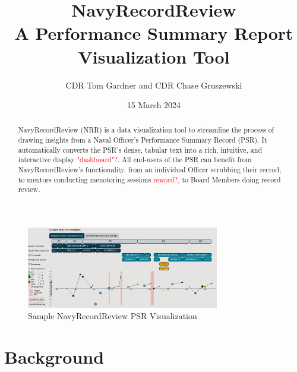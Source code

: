 \documentclass[UTF8]{article}
\begin{document}
\title{
  NavyRecordReview \\
  \large A Performance Summary Report Visualization Tool
}

\author{CDR Tom Gardner and CDR Chase Gruszewski}
\date{15 March 2024}
\maketitle


\begin{abstract}
NavyRecordReview (NRR) is a data visualization tool to streamline the process of
drawing insights from a Naval Officer's Performance Summary Record (PSR). It 
automatically converts the PSR's dense, tabular text into a rich, intuitive, 
and interactive display \textcolor{red}{"dashboard"?}. All end-users of the PSR
can benefit from NavyRecordReview's functionality, from an individual Officer 
scrubbing their recrod, to mentors conducting menotoring sessions 
\textcolor{red}{reword?}, to Board Members doing record review. 

\end{abstract}



 \begin{figure}[h!]

 \centering

  \includegraphics[width=0.75\textwidth]{nrr_dashboard.png}

 \caption{Sample NavyRecordReview PSR Visualization}

 \end{figure}


\section{Background}
\end{document}

